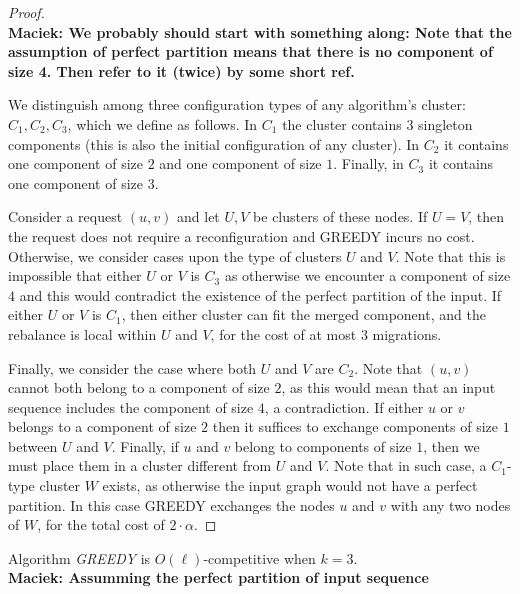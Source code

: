 \documentclass[manuscript,screen=true]{acmart}
\newcommand\maciek[1]{\color{brown}\textbf{\\ Maciek: #1}\color{black}}
\begin{document}
\begin{proof} 

  \maciek{We probably should start with something along: Note that the assumption of perfect partition means that there is no component of size 4. Then refer to it (twice) by some short ref.}
  
  We distinguish among three configuration types of any algorithm's cluster: $C_1, C_2, C_3$, which we define as follows. In $C_1$ the cluster contains $3$ singleton components (this is also the initial configuration of any cluster). In $C_2$ it contains one component of size $2$ and one component of size $1$. Finally, in $C_3$ it contains one component of size $3$.

  Consider a request $(u, v)$ and let $U, V$ be clusters of these nodes.
  If $U=V$, then the request does not require a reconfiguration and GREEDY incurs no cost.
  Otherwise, we consider cases upon the type of clusters $U$ and $V$.
  Note that this is impossible that either $U$ or $V$ is $C_3$ as otherwise we encounter a component of size $4$ and this would contradict the existence of the perfect partition of the input.
  If either $U$ or $V$ is $C_1$, then either cluster can fit the merged component, and the rebalance is local within $U$ and $V$, for the cost of at most $3$ migrations.

  Finally, we consider the case where both $U$ and $V$ are $C_2$. Note that $(u,v)$ cannot both belong to a component of size $2$, as this would mean that an input sequence includes the component of size $4$, a contradiction. 
  If either $u$ or $v$ belongs to a component of size $2$ then it suffices to exchange components of size $1$ between $U$ and $V$.
  Finally, if $u$ and $v$ belong to components of size $1$, then we must place them in a cluster different from $U$ and $V$.
  Note that in such case, a $C_1$-type cluster $W$ exists, as otherwise the input graph would not have a perfect partition. In this case GREEDY exchanges the nodes $u$ and $v$ with any two nodes of $W$, for the total cost of $2\cdot \alpha$.
\end{proof}

  
\begin{theorem}
  Algorithm \emph{GREEDY} is $O(\ell)$-competitive when $k=3$.
  \maciek{Assumming the perfect partition of input sequence}
\end{theorem}
\end{document}
